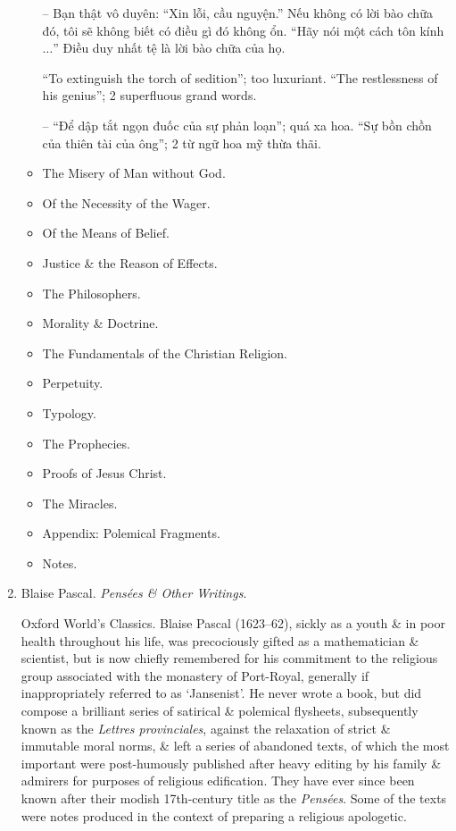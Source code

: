 \documentclass{article}
\begin{document}
\begin{enumerate}
\begin{itemize}
		-- Bạn thật vô duyên: ``Xin lỗi, cầu nguyện.'' Nếu không có lời bào chữa đó, tôi sẽ không biết có điều gì đó không ổn. ``Hãy nói một cách tôn kính $\ldots$'' Điều duy nhất tệ là lời bào chữa của họ.
		
		 ``To extinguish the torch of sedition''; too luxuriant. ``The restlessness of his genius''; 2 superfluous grand words.
		
		-- ``Để dập tắt ngọn đuốc của sự phản loạn''; quá xa hoa. ``Sự bồn chồn của thiên tài của ông''; 2 từ ngữ hoa mỹ thừa thãi.		
			 
		\item {\sf The Misery of Man without God.}
		\item {\sf Of the Necessity of the Wager.}
		\item {\sf Of the Means of Belief.}
		\item {\sf Justice \& the Reason of Effects.}
		\item {\sf The Philosophers.}
		\item {\sf Morality \& Doctrine.}
		\item {\sf The Fundamentals of the Christian Religion.}
		\item {\sf Perpetuity.}
		\item {\sf Typology.}
		\item {\sf The Prophecies.}
		\item {\sf Proofs of Jesus Christ.}
		\item {\sf The Miracles.}
		\item {\sf Appendix: Polemical Fragments.}
		\item {\sf Notes.}
	\end{itemize}
	
	
	\item {\sc Blaise Pascal}. {\it Pens\'ees \& Other Writings}.
	
	{\sf Oxford World's Classics.} {\sc Blaise Pascal} (1623--62), sickly as a youth \& in poor health throughout his life, was precociously gifted as a mathematician \& scientist, but is now chiefly remembered for his commitment to the religious group associated with the monastery of Port-Royal, generally if inappropriately referred to as `Jansenist'. He never wrote a book, but did compose a brilliant series of satirical \& polemical flysheets, subsequently known as the {\it Lettres provinciales}, against the relaxation of strict \& immutable moral norms, \& left a series of abandoned texts, of which the most important were post-humously published after heavy editing by his family \& admirers for purposes of religious edification. They have ever since been known after their modish 17th-century title as the {\it Pens\'ees}. Some of the texts were notes produced in the context of preparing a religious apologetic.
	

\end{enumerate}
\end{document}
